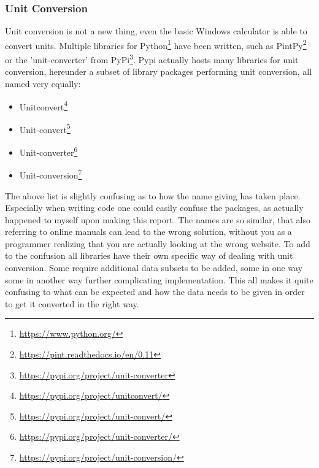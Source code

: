 \documentclass[sigchi, nonacm]{acmart}
\begin{document}
\subsubsection{Unit Conversion} Unit conversion is not a new thing, even the basic Windows calculator is able to convert units. Multiple libraries for Python\footnote{\raggedright{\url{https://www.python.org/}}} have been written, such as PintPy\footnote{\raggedright\url{https://pint.readthedocs.io/en/0.11}} or the 'unit-converter' from PyPi\footnote{\raggedright\url{https://pypi.org/project/unit-converter}}. Pypi actually hosts many libraries for unit conversion, hereunder a subset of library packages performing unit conversion, all named very equally:
\begin{itemize}
    \item {Unitconvert\footnote{\raggedright{\url{https://pypi.org/project/unitconvert/}}}}
    \item {Unit-convert\footnote{\raggedright{\url{https://pypi.org/project/unit-convert/}}}}
    \item {Unit-converter\footnote{\raggedright{\url{https://pypi.org/project/unit-converter/}}}}
    \item {Unit-conversion\footnote{\raggedright\url{https://pypi.org/project/unit-conversion/}}}
\end{itemize}

The above list is slightly confusing as to how the name giving has taken place. Especially when writing code one could easily confuse the packages, as actually happened to myself upon making this report. The names are so similar, that also referring to online manuals can lead to the wrong solution, without you as a programmer realizing that you are actually looking at the wrong website. To add to the confusion all libraries have their own specific way of dealing with unit conversion. Some require additional data subsets to be added, some in one way some in another way further complicating implementation. This all makes it quite confusing to what can be expected and how the data needs to be given in order to get it converted in the right way.
\end{document}
